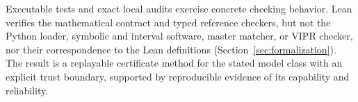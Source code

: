 Executable tests and exact local audits exercise concrete checking behavior. Lean verifies the mathematical contract and typed reference checkers, but not the Python loader, symbolic and interval software, master matcher, or VIPR checker, nor their correspondence to the Lean definitions (Section~\ref{sec:formalization}). The result is a replayable certificate method for the stated model class with an explicit trust boundary, supported by reproducible evidence of its capability and reliability.
